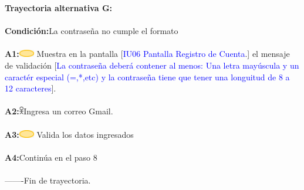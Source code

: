                     \textbf{Trayectoria alternativa G:}\\\\
                        \textbf{Condición:}La contraseña no cumple el formato\\\\
                        \textbf{A1:}\includegraphics[width=0.0500\textwidth]{Figuras/sistema.png} Muestra en la pantalla [\textcolor{blue}{IU06 Pantalla Registro de Cuenta}.] el mensaje de validación [\textcolor{blue}{La contraseña deberá contener al menos: Una letra mayúscula y un caractér especial (=,*,etc) y la contraseña tiene que tener una longuitud de 8 a 12 caracteres}].  \\\\
                        \textbf{A2:}\includegraphics[width=0.0150\textwidth]{Figuras/persona.png}Ingresa un correo Gmail.\\\\
                        \textbf{A3:}\includegraphics[width=0.0500\textwidth]{Figuras/sistema.png} Valida los datos ingresados\\\\ 
                        \textbf{A4:}Continúa en el paso 8 \\\\
                       
        -------Fin de  trayectoria. \\\\

